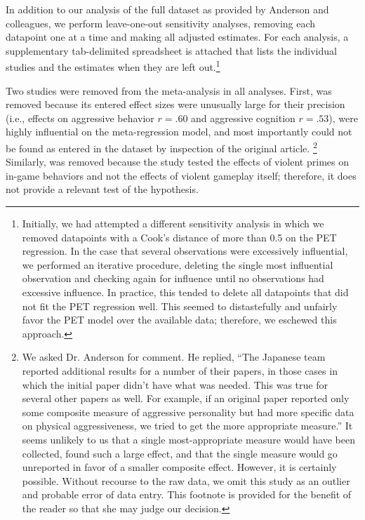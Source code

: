 \documentclass[man]{apa6}
\begin{document}
In addition to our analysis of the full dataset as provided by Anderson and colleagues, we perform leave-one-out sensitivity analyses, removing each datapoint one at a time and making all adjusted estimates. For each analysis, a supplementary tab-delimited spreadsheet is attached that lists the individual studies and the estimates when they are left out.\footnote{Initially, we had attempted a different sensitivity analysis in which we removed datapoints with a Cook's distance of more than 0.5 on the PET regression. In the case that several observations were excessively influential, we performed an iterative procedure, deleting the single most influential observation and checking again for influence until no observations had excessive influence. In practice, this tended to delete all datapoints that did not fit the PET regression well. This seemed to distastefully and unfairly favor the PET model over the available data; therefore, we eschewed this approach.}

Two studies were removed from the meta-analysis in all analyses. First, \citet[study 1]{Matsuzaki:etal:2006} was removed because its entered effect sizes were unusually large for their precision (i.e., effects on aggressive behavior $r = .60$ and aggressive cognition $r = .53$), were highly influential on the meta-regression model, and most importantly could not be found as entered in the \citet{Anderson:etal:2010} dataset by inspection of the original article. \footnote{We asked Dr. Anderson for comment. He replied, ``The Japanese team reported additional results for a number of their papers, in those cases in which the initial paper didn't have what was needed. This was true for several other papers as well. For example, if an original paper reported only some composite measure of aggressive personality but had more specific data on physical aggressiveness, we tried to get the more appropriate measure.'' It seems unlikely to us that a single most-appropriate measure would have been collected, found such a large effect, and that the single measure would go unreported in favor of a smaller composite effect. However, it is certainly possible. Without recourse to the raw data, we omit this study as an outlier and probable error of data entry. This footnote is provided for the benefit of the reader so that she may judge our decision.}
Similarly, \citet{Panee:Ballard:2002} was removed because the study tested the effects of violent primes on in-game behaviors and not the effects of violent gameplay itself; therefore, it does not provide a relevant test of the hypothesis. %
\end{document}
